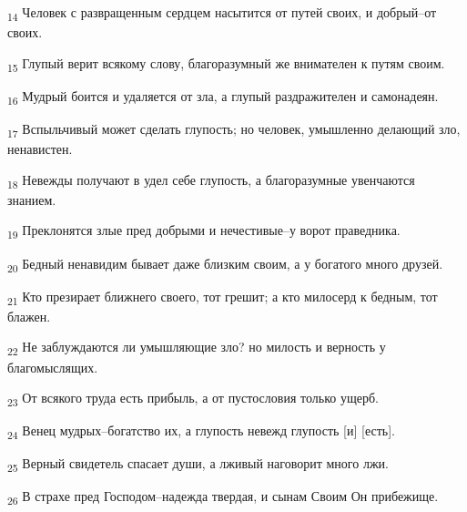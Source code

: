 \begin{tcolorbox}
\textsubscript{14} Человек с развращенным сердцем насытится от путей своих, и добрый--от своих.
\end{tcolorbox}
\begin{tcolorbox}
\textsubscript{15} Глупый верит всякому слову, благоразумный же внимателен к путям своим.
\end{tcolorbox}
\begin{tcolorbox}
\textsubscript{16} Мудрый боится и удаляется от зла, а глупый раздражителен и самонадеян.
\end{tcolorbox}
\begin{tcolorbox}
\textsubscript{17} Вспыльчивый может сделать глупость; но человек, умышленно делающий зло, ненавистен.
\end{tcolorbox}
\begin{tcolorbox}
\textsubscript{18} Невежды получают в удел себе глупость, а благоразумные увенчаются знанием.
\end{tcolorbox}
\begin{tcolorbox}
\textsubscript{19} Преклонятся злые пред добрыми и нечестивые--у ворот праведника.
\end{tcolorbox}
\begin{tcolorbox}
\textsubscript{20} Бедный ненавидим бывает даже близким своим, а у богатого много друзей.
\end{tcolorbox}
\begin{tcolorbox}
\textsubscript{21} Кто презирает ближнего своего, тот грешит; а кто милосерд к бедным, тот блажен.
\end{tcolorbox}
\begin{tcolorbox}
\textsubscript{22} Не заблуждаются ли умышляющие зло? но милость и верность у благомыслящих.
\end{tcolorbox}
\begin{tcolorbox}
\textsubscript{23} От всякого труда есть прибыль, а от пустословия только ущерб.
\end{tcolorbox}
\begin{tcolorbox}
\textsubscript{24} Венец мудрых--богатство их, а глупость невежд глупость [и] [есть].
\end{tcolorbox}
\begin{tcolorbox}
\textsubscript{25} Верный свидетель спасает души, а лживый наговорит много лжи.
\end{tcolorbox}
\begin{tcolorbox}
\textsubscript{26} В страхе пред Господом--надежда твердая, и сынам Своим Он прибежище.
\end{tcolorbox}
